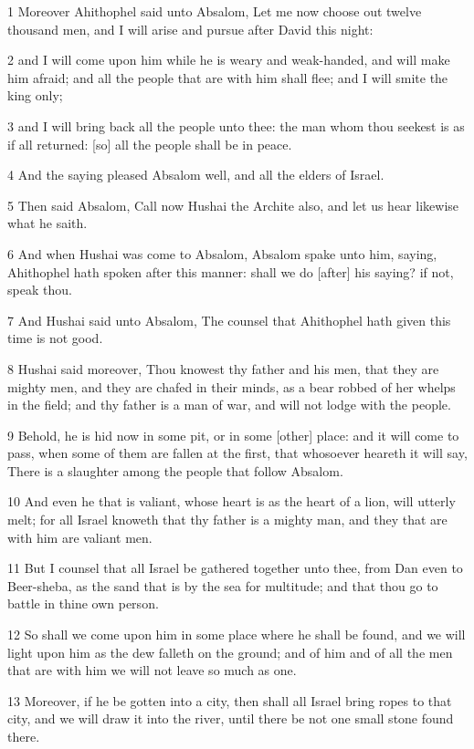 \par 1 Moreover Ahithophel said unto Absalom, Let me now choose out twelve thousand men, and I will arise and pursue after David this night:
\par 2 and I will come upon him while he is weary and weak-handed, and will make him afraid; and all the people that are with him shall flee; and I will smite the king only;
\par 3 and I will bring back all the people unto thee: the man whom thou seekest is as if all returned: [so] all the people shall be in peace.
\par 4 And the saying pleased Absalom well, and all the elders of Israel.
\par 5 Then said Absalom, Call now Hushai the Archite also, and let us hear likewise what he saith.
\par 6 And when Hushai was come to Absalom, Absalom spake unto him, saying, Ahithophel hath spoken after this manner: shall we do [after] his saying? if not, speak thou.
\par 7 And Hushai said unto Absalom, The counsel that Ahithophel hath given this time is not good.
\par 8 Hushai said moreover, Thou knowest thy father and his men, that they are mighty men, and they are chafed in their minds, as a bear robbed of her whelps in the field; and thy father is a man of war, and will not lodge with the people.
\par 9 Behold, he is hid now in some pit, or in some [other] place: and it will come to pass, when some of them are fallen at the first, that whosoever heareth it will say, There is a slaughter among the people that follow Absalom.
\par 10 And even he that is valiant, whose heart is as the heart of a lion, will utterly melt; for all Israel knoweth that thy father is a mighty man, and they that are with him are valiant men.
\par 11 But I counsel that all Israel be gathered together unto thee, from Dan even to Beer-sheba, as the sand that is by the sea for multitude; and that thou go to battle in thine own person.
\par 12 So shall we come upon him in some place where he shall be found, and we will light upon him as the dew falleth on the ground; and of him and of all the men that are with him we will not leave so much as one.
\par 13 Moreover, if he be gotten into a city, then shall all Israel bring ropes to that city, and we will draw it into the river, until there be not one small stone found there.
